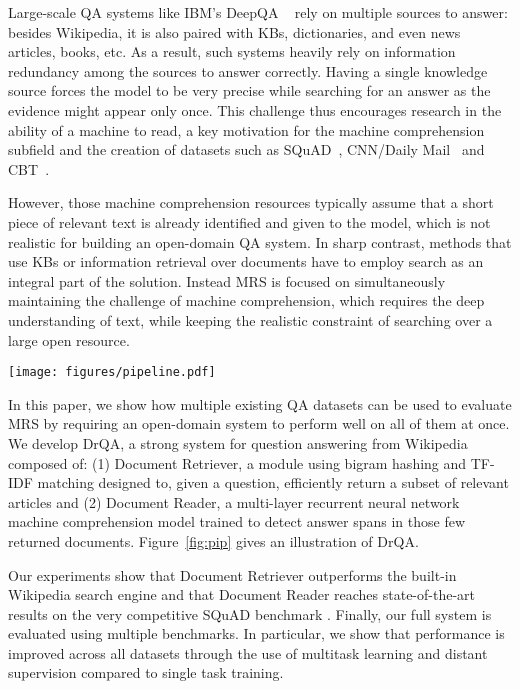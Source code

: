 \documentclass[11pt,a4paper]{article}
\newcommand\us{DrQA\xspace}
\newcommand\usr{Document Retriever\xspace}
\newcommand\usp{Document Reader\xspace}
\begin{document}
Large-scale QA systems like IBM's DeepQA ~\cite{ferrucci2010building} rely on multiple sources to answer: besides Wikipedia, it is also paired with KBs, dictionaries, and even news articles, books, etc. As a result, such systems heavily rely on information redundancy among the sources to answer correctly. Having a single knowledge source forces the model to be very precise while searching for an answer as the evidence might appear only once. This challenge thus encourages research in the ability of a machine to read, a key motivation for the machine comprehension subfield and the creation of datasets such as SQuAD~\cite{rajpurkar2016squad}, CNN/Daily Mail~\cite{nips2015hermann} and CBT~\cite{hill2015goldilocks}.

However, those machine comprehension resources typically assume that a short piece of relevant text is already identified and given to the model, which is not realistic for building an open-domain QA system. In sharp contrast, methods that use KBs or information retrieval over documents have to employ search as an integral part of the solution. Instead MRS is focused on simultaneously maintaining the challenge of machine comprehension, which requires the deep understanding of text, while keeping the realistic constraint of searching over a large open resource.

\begin{figure*}
    \begin{center}
    \texttt{[image: figures/pipeline.pdf]}
    \end{center}
    \vspace{-1em}
    \caption{\label{fig:pip} An overview of our question answering system \us. }
\end{figure*}





In this paper, we show how multiple existing QA datasets can be used to evaluate MRS by requiring an open-domain system to perform well on all of them at once.
We develop \us, a strong system for question answering from Wikipedia composed of: (1)  \usr, a module using bigram hashing and TF-IDF matching  designed to, given a question, efficiently return a subset of relevant articles and (2) \usp, a multi-layer recurrent neural network machine comprehension
model trained to detect answer spans in those few returned  documents.
Figure~\ref{fig:pip} gives an illustration of \us.


Our experiments show that \usr outperforms the built-in Wikipedia search engine and that \usp reaches state-of-the-art results on the very competitive SQuAD benchmark \cite{rajpurkar2016squad}.
Finally, our full system is evaluated using multiple benchmarks. In particular, we show that performance is improved across all datasets through the use of multitask learning and distant supervision compared to single task training. 
\end{document}
